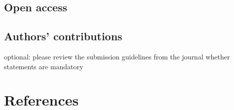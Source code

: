 \documentclass[
  man,floatsintext]{apa6}
\begin{document}
\hypertarget{open-access}{%
\subsection{Open access}\label{open-access}}

\hypertarget{authors-contributions}{%
\subsection{Authors' contributions}\label{authors-contributions}}

optional: please review the submission guidelines from the journal whether statements are mandatory

\newpage

\hypertarget{references}{%
\section{References}\label{references}}

\begingroup
\setlength{\parindent}{-0.5in}
\setlength{\leftskip}{0.5in}
\end{document}
